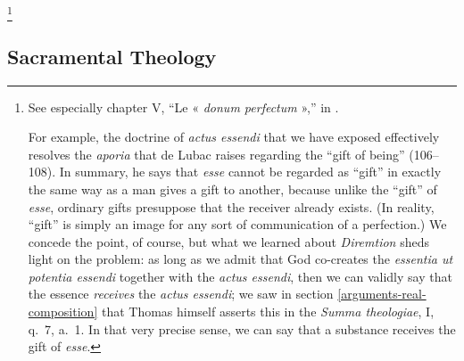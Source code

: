\footnote{See especially chapter V, ``Le « \emph{donum perfectum} »,'' in \cite[105--134]{delubac:mystere}%
.

For example, the doctrine of \emph{actus essendi} that we have exposed effectively resolves the \emph{aporia} that de Lubac raises regarding the ``gift of being'' (106--108). In summary, he says that \emph{esse} cannot be regarded as ``gift'' in exactly the same way as a man gives a gift to another, because unlike the ``gift'' of \emph{esse}, ordinary gifts presuppose that the receiver already exists. (In reality, ``gift'' is simply an image for any sort of communication of a perfection.) We concede the point, of course, but what we learned about \emph{Diremtion} sheds light on the problem: as long as we admit that God co-creates the \emph{essentia ut potentia essendi} together with the \emph{actus essendi}, then we can validly say that the essence \emph{receives} the \emph{actus essendi}; we saw in section \ref{arguments-real-composition} that Thomas himself asserts this in the \emph{Summa theologiae}, I, q.~7, a.~1. In that very precise sense, we can say that a substance receives the gift of \emph{esse}.}
%


\subsection{Sacramental Theology}

